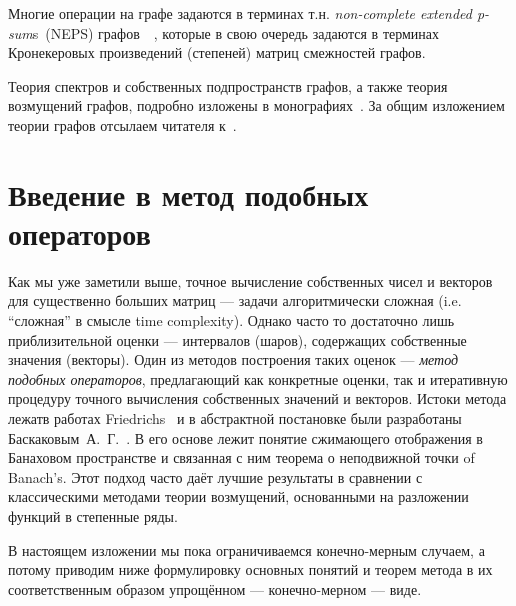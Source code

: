 \documentclass[14pt,a4paper]{extarticle}
\theoremstyle{definition}
\begin{document}
Многие операции на графе задаются в терминах т.н.
    \emph{non-complete extended p-sum}s~(NEPS)
    графов~\cite[p.~44]{cvetkovic2010introduction}~\cite{cvetkovic1997eigenspaces},
    которые в свою очередь задаются в терминах Кронекеровых произведений (степеней) матриц
    смежностей графов.

Теория спектров и собственных подпространств графов,
    а также теория возмущений графов, подробно изложены в
    монографиях~\cite{cvetkovic1997eigenspaces,cvetkovic1980spectra,cvetkovic2010introduction}.
    За общим изложением теории графов отсылаем читателя к~\cite{godsil2013algebraic}.


\section{Введение в метод подобных операторов}

Как мы уже заметили выше, точное вычисление собственных чисел и векторов
для существенно больших матриц --- задачи алгоритмически сложная (i.e. ``сложная'' в
смысле time complexity). Однако часто то достаточно лишь приблизительной оценки
--- интервалов (шаров), содержащих собственные значения (векторы).
Один из методов построения таких оценок ---
\emph{метод подобных операторов}, предлагающий как конкретные оценки, так и
итеративную процедуру точного вычисления собственных значений и векторов.
Истоки метода лежатв работах Friedrichs~\cite{friedrichs1965advanced} и в
абстрактной постановке были разработаны
Баскаковым~А.~Г.~\cite{baskakov1986theorem,baskakov1987theorem,baskakov1994spectral,baskakov2002splitting}.
В его основе лежит понятие сжимающего отображения в Банаховом пространстве
и связанная с ним теорема о неподвижной точки of Banach's.
Этот подход часто даёт лучшие результаты в сравнении с классическими методами
теории возмущений, основанными на разложении функций в степенные ряды.

В настоящем изложении мы пока ограничиваемся конечно-мерным случаем, а потому
приводим ниже формулировку основных понятий и теорем метода в их соответственным
образом упрощённом --- конечно-мерном --- виде.
\end{document}
